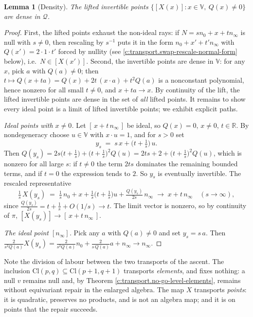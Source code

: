 \documentclass[11pt]{article}
\newtheorem{lemma}[theorem]{Lemma}
\theoremstyle{definition}
\theoremstyle{plain}
\providecommand{\Cl}{}\renewcommand{\Cl}{\mathrm{Cl}}
\providecommand{\R}{}\renewcommand{\R}{\mathbb{R}}
\providecommand{\nInf}{}\renewcommand{\nInf}{n_\infty}
\providecommand{\nO}{}\renewcommand{\nO}{n_0}
\begin{document}
\begin{lemma}[Density]\label{c:transport.density}
The lifted invertible points $\{[X(x)] : x \in \mathbb{V},\ Q(x) \neq 0\}$ are dense in $\mathcal{Q}$.
\end{lemma}
\begin{proof}
First, the lifted points exhaust the non-ideal rays: if $N = s\nO + x + t\nInf$ is null with $s \neq 0$, then rescaling by $s^{-1}$ puts it in the form $\nO + x' + t'\nInf$ with $Q(x') = 2 \cdot 1 \cdot t'$ forced by nullity (see \ref{c:transport.swap-rescale-normal-form} below), i.e.\ $N \in [X(x')]$. Second, the invertible points are dense in $\mathbb{V}$: for any $x$, pick $a$ with $Q(a) \neq 0$; then $t \mapsto Q(x + ta) = Q(x) + 2t\,(x \cdot a) + t^2 Q(a)$ is a nonconstant polynomial, hence nonzero for all small $t \neq 0$, and $x + ta \to x$. By continuity of the lift, the lifted invertible points are dense in the set of \emph{all} lifted points. It remains to show every ideal point is a limit of lifted invertible points; we exhibit explicit paths.

\emph{Ideal points with $x \neq 0$.} Let $[\,x + t\,\nInf\,]$ be ideal, so $Q(x) = 0$, $x \neq 0$, $t \in \R$. By nondegeneracy choose $u \in \mathbb{V}$ with $x \cdot u = 1$, and for $s > 0$ set
\[
y_s \;=\; s\,x + \bigl(t + \tfrac{1}{s}\bigr)\,u .
\]
Then $Q(y_s) = 2s\bigl(t + \tfrac1s\bigr) + \bigl(t + \tfrac1s\bigr)^2 Q(u) = 2ts + 2 + \bigl(t + \tfrac1s\bigr)^2 Q(u)$, which is nonzero for all large $s$: if $t \neq 0$ the term $2ts$ dominates the remaining bounded terms, and if $t = 0$ the expression tends to $2$. So $y_s$ is eventually invertible. The rescaled representative
\[
\tfrac{1}{s}\,X(y_s) \;=\; \tfrac{1}{s}\,\nO + x + \tfrac{1}{s}\bigl(t + \tfrac1s\bigr)u + \tfrac{Q(y_s)}{2s}\,\nInf
\;\longrightarrow\; x + t\,\nInf \quad (s \to \infty),
\]
since $\tfrac{Q(y_s)}{2s} = t + \tfrac1s + O(1/s) \to t$. The limit vector is nonzero, so by continuity of $\pi$, $[X(y_s)] \to [\,x + t\,\nInf\,]$.

\emph{The ideal point $[\nInf]$.} Pick any $a$ with $Q(a) \neq 0$ and set $y_s = s\,a$. Then $\tfrac{2}{s^2 Q(a)} X(y_s) = \tfrac{2}{s^2 Q(a)} \nO + \tfrac{2}{s\,Q(a)}a + \nInf \to \nInf$.

\end{proof}

\label{c:note.transport.setting-completion-conformal-model-3}
Note the division of labour between the two transports of the ascent. The inclusion $\Cl(p,q) \subseteq \Cl(p{+}1,q{+}1)$ transports \emph{elements}, and fixes nothing: a null $v$ remains null and, by Theorem \ref{c:transport.no-go-level-elements}, remains without equivariant repair in the enlarged algebra. The map $X$ transports \emph{points}: it is quadratic, preserves no products, and is not an algebra map; and it is on points that the repair succeeds.
\end{document}
